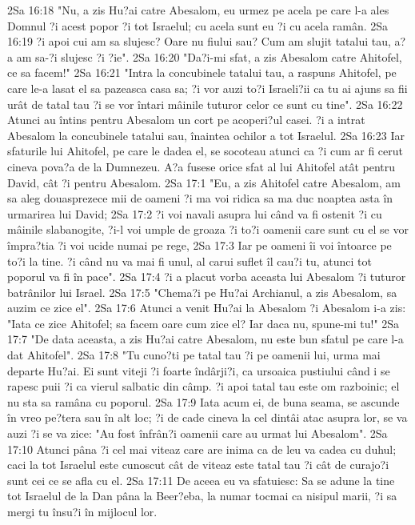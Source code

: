 2Sa 16:18  "Nu, a zis Hu?ai catre Abesalom, eu urmez pe acela pe care l-a ales Domnul ?i acest popor ?i tot Israelul; cu acela sunt eu ?i cu acela ramân.
2Sa 16:19  ?i apoi cui am sa slujesc? Oare nu fiului sau? Cum am slujit tatalui tau, a?a am sa-?i slujesc ?i ?ie".
2Sa 16:20  "Da?i-mi sfat, a zis Abesalom catre Ahitofel, ce sa facem!"
2Sa 16:21  "Intra la concubinele tatalui tau, a raspuns Ahitofel, pe care le-a lasat el sa pazeasca casa sa; ?i vor auzi to?i Israeli?ii ca tu ai ajuns sa fii urât de tatal tau ?i se vor întari mâinile tuturor celor ce sunt cu tine".
2Sa 16:22  Atunci au întins pentru Abesalom un cort pe acoperi?ul casei. ?i a intrat Abesalom la concubinele tatalui sau, înaintea ochilor a tot Israelul.
2Sa 16:23  Iar sfaturile lui Ahitofel, pe care le dadea el, se socoteau atunci ca ?i cum ar fi cerut cineva pova?a de la Dumnezeu. A?a fusese orice sfat al lui Ahitofel atât pentru David, cât ?i pentru Abesalom.
2Sa 17:1  "Eu, a zis Ahitofel catre Abesalom, am sa aleg douasprezece mii de oameni ?i ma voi ridica sa ma duc noaptea asta în urmarirea lui David;
2Sa 17:2  ?i voi navali asupra lui când va fi ostenit ?i cu mâinile slabanogite, ?i-l voi umple de groaza ?i to?i oamenii care sunt cu el se vor împra?tia ?i voi ucide numai pe rege,
2Sa 17:3  Iar pe oameni îi voi întoarce pe to?i la tine. ?i când nu va mai fi unul, al carui suflet îl cau?i tu, atunci tot poporul va fi în pace".
2Sa 17:4  ?i a placut vorba aceasta lui Abesalom ?i tuturor batrânilor lui Israel.
2Sa 17:5  "Chema?i pe Hu?ai Archianul, a zis Abesalom, sa auzim ce zice el".
2Sa 17:6  Atunci a venit Hu?ai la Abesalom ?i Abesalom i-a zis: "Iata ce zice Ahitofel; sa facem oare cum zice el? Iar daca nu, spune-mi tu!"
2Sa 17:7  "De data aceasta, a zis Hu?ai catre Abesalom, nu este bun sfatul pe care l-a dat Ahitofel".
2Sa 17:8  "Tu cuno?ti pe tatal tau ?i pe oamenii lui, urma mai departe Hu?ai. Ei sunt viteji ?i foarte îndârji?i, ca ursoaica pustiului când i se rapesc puii ?i ca vierul salbatic din câmp. ?i apoi tatal tau este om razboinic; el nu sta sa ramâna cu poporul.
2Sa 17:9  Iata acum ei, de buna seama, se ascunde în vreo pe?tera sau în alt loc; ?i de cade cineva la cel dintâi atac asupra lor, se va auzi ?i se va zice: "Au fost înfrân?i oamenii care au urmat lui Abesalom".
2Sa 17:10  Atunci pâna ?i cel mai viteaz care are inima ca de leu va cadea cu duhul; caci la tot Israelul este cunoscut cât de viteaz este tatal tau ?i cât de curajo?i sunt cei ce se afla cu el.
2Sa 17:11  De aceea eu va sfatuiesc: Sa se adune la tine tot Israelul de la Dan pâna la Beer?eba, la numar tocmai ca nisipul marii, ?i sa mergi tu însu?i în mijlocul lor.

